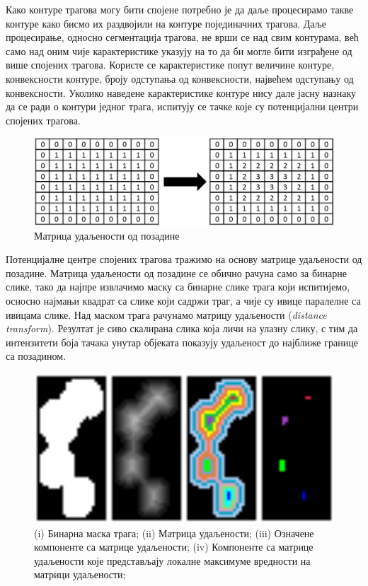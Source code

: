 \documentclass[11pt,a4paper,serbian,oneside]{book}
\begin{document}
Како контуре трагова могу бити спојене  потребно је да даље процесирамо такве контуре како бисмо их раздвојили на контуре појединачних трагова. Даље процесирање, односно сегментација трагова, не врши се над свим контурама, већ само над оним чије карактеристике указују на то да би могле бити изграђене од више спојених трагова. Користе се карактеристике попут величине контуре, конвексности контуре, броју одступања од конвексности, највећем одступању од конвексности. Уколико наведене карактеристике контуре нису дале јасну назнаку да се ради о контури једног трага, испитују се тачке које су потенцијални центри спојених трагова.

\begin{figure}[htb]
\begin{center}
\includegraphics[width=120mm]{images/distance_matrix.png}
\end{center}
\caption{Матрица удаљености од позадине}
\label{fig:dist_matric}
\end{figure}

Потенцијалне центре спојених трагова тражимо на основу матрице удаљености од позадине. Матрица удаљености од позадине се обично рачуна само за бинарне слике, тако да  најпре извлачимо маску са бинарне слике трага који испитијемо, осносно најмањи квадрат са слике који садржи траг, а чије су ивице паралелне са ивицама слике. Над маском трага рачунамо матрицу удаљености (\textit{distance transform}). Резултат је сиво скалирана слика која личи на улазну слику, с тим да интензитети боја тачака унутар објеката показују удаљеност до најближе границе са позадином.

\begin{figure}[htb]
\begin{center}
\includegraphics[width=150mm]{images/local_maxima.png}
\end{center}
\caption{(i) Бинарна маска трага; (ii) Матрица удаљености; (iii) Означене компоненте са матрице удаљености; (iv) Компоненте са матрице удаљености које представљају локалне максимуме вредности на матрици удаљености; }
\label{fig:local_maxima}
\end{figure}
\end{document}
